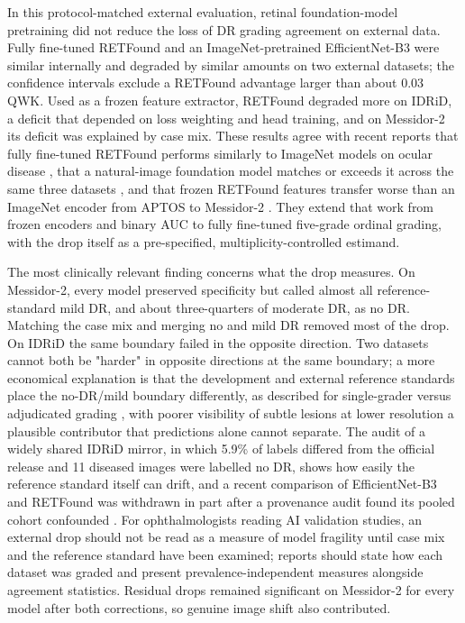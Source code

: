 \documentclass[pdflatex,sn-basic,Numbered]{sn-jnl}
\begin{document}
In this protocol-matched external evaluation, retinal foundation-model pretraining did not reduce the loss of DR grading agreement on external data. Fully fine-tuned RETFound and an ImageNet-pretrained EfficientNet-B3 were similar internally and degraded by similar amounts on two external datasets; the confidence intervals exclude a RETFound advantage larger than about 0.03 QWK. Used as a frozen feature extractor, RETFound degraded more on IDRiD, a deficit that depended on loss weighting and head training, and on Messidor-2 its deficit was explained by case mix. These results agree with recent reports that fully fine-tuned RETFound performs similarly to ImageNet models on ocular disease \cite{yew2026}, that a natural-image foundation model matches or exceeds it across the same three datasets \cite{hou2025dinov2}, and that frozen RETFound features transfer worse than an ImageNet encoder from APTOS to Messidor-2 \cite{poyrazer2026}. They extend that work from frozen encoders and binary AUC to fully fine-tuned five-grade ordinal grading, with the drop itself as a pre-specified, multiplicity-controlled estimand.

The most clinically relevant finding concerns what the drop measures. On Messidor-2, every model preserved specificity but called almost all reference-standard mild DR, and about three-quarters of moderate DR, as no DR. Matching the case mix and merging no and mild DR removed most of the drop. On IDRiD the same boundary failed in the opposite direction. Two datasets cannot both be "harder" in opposite directions at the same boundary; a more economical explanation is that the development and external reference standards place the no-DR/mild boundary differently, as described for single-grader versus adjudicated grading \cite{krause2018}, with poorer visibility of subtle lesions at lower resolution a plausible contributor that predictions alone cannot separate. The audit of a widely shared IDRiD mirror, in which 5.9\% of labels differed from the official release and 11 diseased images were labelled no DR, shows how easily the reference standard itself can drift, and a recent comparison of EfficientNet-B3 and RETFound was withdrawn in part after a provenance audit found its pooled cohort confounded \cite{alutaibi2026}. For ophthalmologists reading AI validation studies, an external drop should not be read as a measure of model fragility until case mix and the reference standard have been examined; reports should state how each dataset was graded and present prevalence-independent measures alongside agreement statistics. Residual drops remained significant on Messidor-2 for every model after both corrections, so genuine image shift also contributed.
\end{document}
